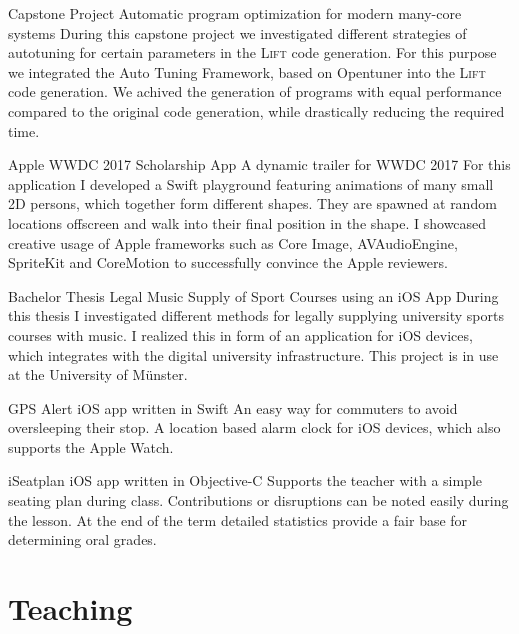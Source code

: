 \documentclass[11pt,a4paper,sans]{moderncv}        %
\newcommand{\Lift}{\textsc{Lift}\xspace}
\begin{document}
					{Capstone Project}
					{Automatic program optimization for modern many-core systems}{}
					{}
					{During this capstone project we investigated different strategies of autotuning for certain parameters in the \Lift code generation. For this purpose we integrated the Auto Tuning Framework, based on Opentuner into the \Lift code generation. We achived the generation of programs with equal performance compared to the original code generation, while drastically reducing the required time.}
	
                    {Apple WWDC 2017 Scholarship App}
					{A dynamic trailer for WWDC 2017}{}
					{}
                    {For this application I developed a Swift playground featuring animations of                        many small 2D persons, which together form different shapes. They are spawned at random locations offscreen and walk into their final position in the shape. 
                    I showcased creative usage of Apple frameworks such as Core Image, AVAudioEngine, SpriteKit and CoreMotion to successfully convince the Apple reviewers.}

					{Bachelor Thesis}
					{Legal Music Supply of Sport Courses using an iOS App}{}
					{}
					{During this thesis I investigated different methods for legally supplying university sports courses with music. I realized this in form of an application for iOS devices, which integrates with the digital university infrastructure. This project is in use at the University of Münster.}
								 
					{GPS Alert}
					{iOS app written in Swift}{}
					{}
					{An easy way for commuters to avoid oversleeping their stop. A location based alarm clock for iOS devices, which also supports the Apple Watch.}
					

					{iSeatplan}
					{iOS app written in Objective-C}{}
					{}
					{Supports the teacher with a simple seating plan during class. Contributions or disruptions can be
noted easily during the lesson. At the end of the term detailed statistics provide a fair base for determining oral
grades.}
					

\section{Teaching}
\end{document}
